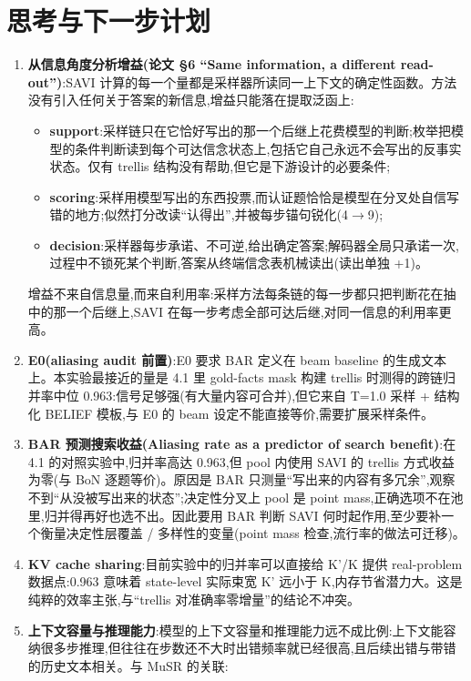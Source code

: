 \documentclass[fontset=none,10.5pt]{ctexart}
\begin{document}
\section{思考与下一步计划}

\begin{enumerate}
\item \textbf{从信息角度分析增益(论文 \S 6 ``Same information, a different read-out'')}:SAVI 计算的每一个量都是采样器所读同一上下文的确定性函数。方法没有引入任何关于答案的新信息,增益只能落在提取泛函上:
  \begin{itemize}
  \item \textbf{support}:采样链只在它恰好写出的那一个后继上花费模型的判断;枚举把模型的条件判断读到每个可达信念状态上,包括它自己永远不会写出的反事实状态。仅有 trellis 结构没有帮助,但它是下游设计的必要条件;
  \item \textbf{scoring}:采样用模型写出的东西投票,而认证题恰恰是模型在分叉处自信写错的地方;似然打分改读``认得出'',并被每步锚句锐化(4$\to$9);
  \item \textbf{decision}:采样器每步承诺、不可逆,给出确定答案;解码器全局只承诺一次,过程中不锁死某个判断,答案从终端信念表机械读出(读出单独 +1)。
  \end{itemize}
  增益不来自信息量,而来自利用率:采样方法每条链的每一步都只把判断花在抽中的那一个后继上,SAVI 在每一步考虑全部可达后继,对同一信息的利用率更高。
\item \textbf{E0(aliasing audit 前置)}:E0 要求 BAR 定义在 beam baseline 的生成文本上。本实验最接近的量是 4.1 里 gold-facts mask 构建 trellis 时测得的跨链归并率中位 0.963:信号足够强(有大量内容可合并),但它来自 T=1.0 采样 + 结构化 BELIEF 模板,与 E0 的 beam 设定不能直接等价,需要扩展采样条件。
\item \textbf{BAR 预测搜索收益(Aliasing rate as a predictor of search benefit)}:在 4.1 的对照实验中,归并率高达 0.963,但 pool 内使用 SAVI 的 trellis 方式收益为零(与 BoN 逐题等价)。原因是 BAR 只测量``写出来的内容有多冗余'',观察不到``从没被写出来的状态'';决定性分叉上 pool 是 point mass,正确选项不在池里,归并得再好也选不出。因此要用 BAR 判断 SAVI 何时起作用,至少要补一个衡量决定性层覆盖 / 多样性的变量(point mass 检查,流行率的做法可迁移)。
\item \textbf{KV cache sharing}:目前实验中的归并率可以直接给 K'/K 提供 real-problem 数据点:0.963 意味着 state-level 实际束宽 K' 远小于 K,内存节省潜力大。这是纯粹的效率主张,与``trellis 对准确率零增量''的结论不冲突。
\item \textbf{上下文容量与推理能力}:模型的上下文容量和推理能力远不成比例:上下文能容纳很多步推理,但往往在步数还不大时出错频率就已经很高,且后续出错与带错的历史文本相关。与 MuSR 的关联:

\end{enumerate}
\end{document}

